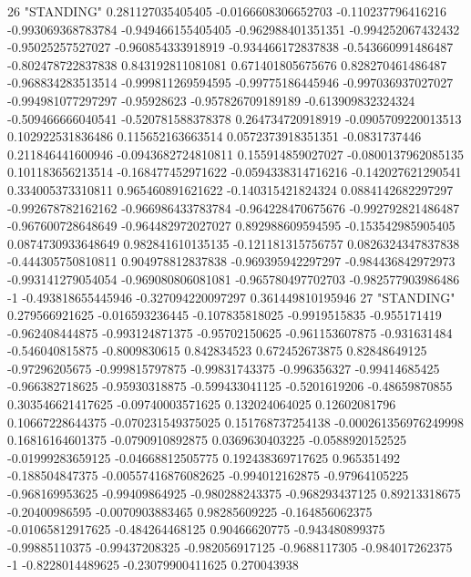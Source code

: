 26 "STANDING" 0.281127035405405 -0.0166608306652703 -0.110237796416216 -0.993069368783784 -0.949466155405405 -0.962988401351351 -0.994252067432432 -0.95025257527027 -0.960854333918919 -0.934466172837838 -0.543660991486487 -0.802478722837838 0.843192811081081 0.671401805675676 0.828270461486487 -0.968834283513514 -0.999811269594595 -0.99775186445946 -0.997036937027027 -0.994981077297297 -0.95928623 -0.957826709189189 -0.613909832324324 -0.509466666040541 -0.520781588378378 0.264734720918919 -0.0905709220013513 0.102922531836486 0.115652163663514 0.0572373918351351 -0.0831737446 0.211846441600946 -0.0943682724810811 0.155914859027027 -0.0800137962085135 0.101183656213514 -0.168477452971622 -0.0594338314716216 -0.142027621290541 0.334005373310811 0.965460891621622 -0.140315421824324 0.0884142682297297 -0.992678782162162 -0.966986433783784 -0.964228470675676 -0.992792821486487 -0.967600728648649 -0.964482972027027 0.892988609594595 -0.153542985905405 0.0874730933648649 0.982841610135135 -0.121181315756757 0.0826324347837838 -0.444305750810811 0.904978812837838 -0.969395942297297 -0.984436842972973 -0.993141279054054 -0.969080806081081 -0.965780497702703 -0.982577903986486 -1 -0.493818655445946 -0.327094220097297 0.361449810195946
27 "STANDING" 0.279566921625 -0.016593236445 -0.107835818025 -0.9919515835 -0.955171419 -0.962408444875 -0.993124871375 -0.95702150625 -0.961153607875 -0.931631484 -0.546040815875 -0.8009830615 0.842834523 0.672452673875 0.82848649125 -0.97296205675 -0.999815797875 -0.99831743375 -0.996356327 -0.99414685425 -0.966382718625 -0.95930318875 -0.599433041125 -0.5201619206 -0.48659870855 0.303546621417625 -0.09740003571625 0.132024064025 0.12602081796 0.10667228644375 -0.070231549375025 0.151768737254138 -0.000261356976249998 0.16816164601375 -0.0790910892875 0.0369630403225 -0.0588920152525 -0.01999283659125 -0.04668812505775 0.192438369717625 0.965351492 -0.188504847375 -0.00557416876082625 -0.994012162875 -0.97964105225 -0.968169953625 -0.99409864925 -0.980288243375 -0.968293437125 0.89213318675 -0.20400986595 -0.0070903883465 0.98285609225 -0.164856062375 -0.01065812917625 -0.484264468125 0.90466620775 -0.943480899375 -0.99885110375 -0.99437208325 -0.982056917125 -0.9688117305 -0.984017262375 -1 -0.8228014489625 -0.23079900411625 0.270043938
